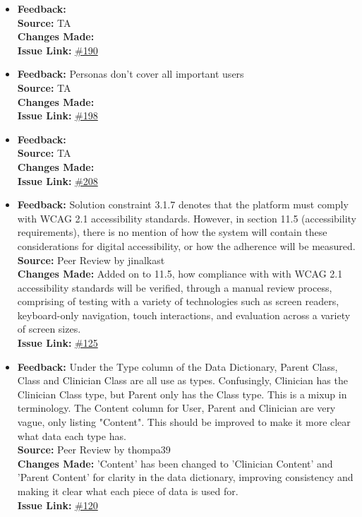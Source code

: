 \documentclass{article}
\begin{document}
\begin{itemize}
  \item 
    \textbf{Feedback:}  \\
    \textbf{Source:} TA \\
    \textbf{Changes Made:} \\
    \textbf{Issue Link:} \href{https://github.com/parishanizam/TeleHealth/issues/190}{\#190}

  \item 
    \textbf{Feedback:} Personas don't cover all important users \\
    \textbf{Source:} TA \\
    \textbf{Changes Made:} \\
    \textbf{Issue Link:} \href{https://github.com/parishanizam/TeleHealth/issues/198}{\#198}

  \item 
    \textbf{Feedback:}  \\
    \textbf{Source:} TA \\
    \textbf{Changes Made:} \\
    \textbf{Issue Link:} \href{https://github.com/parishanizam/TeleHealth/issues/208}{\#208}

  \item 
    \textbf{Feedback:} Solution constraint 3.1.7 denotes that the platform must comply with WCAG 2.1 accessibility standards. However, in section 11.5 (accessibility requirements), there is no mention of how the system will contain these considerations for digital accessibility, or how the adherence will be measured. \\
    \textbf{Source:} Peer Review by jinalkast\\
    \textbf{Changes Made:} Added on to 11.5, how compliance with with WCAG 2.1 accessibility standards will be verified, through a manual review process, comprising of testing
    with a variety of technologies such as screen readers, keyboard-only navigation, touch interactions, and evaluation across a variety of screen sizes.\\
    \textbf{Issue Link:} \href{https://github.com/parishanizam/TeleHealth/issues/125}{\#125}

  \item 
    \textbf{Feedback:} Under the Type column of the Data Dictionary, Parent Class, Class and Clinician Class are all use as types. Confusingly, Clinician has the Clinician Class type, but Parent only has the Class type. This is a mixup in terminology.
    The Content column for User, Parent and Clinician are very vague, only listing "Content". This should be improved to make it more clear what data each type has. \\
    \textbf{Source:} Peer Review by thompa39\\
    \textbf{Changes Made:} 'Content' has been changed to 'Clinician Content' and 'Parent Content' for clarity in the data dictionary, improving consistency and making it clear what each piece of data is used for.\\
    \textbf{Issue Link:} \href{https://github.com/parishanizam/TeleHealth/issues/120}{\#120}


\end{itemize}
\end{document}
